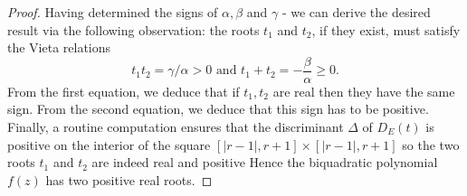 \documentclass{article}
\theoremstyle{definition}
\renewcommand{\|}{|}
\newcommand{\arun}[1]{{\color{cyan} #1}}
\begin{document}
\begin{proof}
Having determined the signs of $\alpha,\beta$ and $\gamma$ - we can derive the desired result via the following observation: the roots $t_1$ and $t_2$, if they exist, must satisfy the Vieta relations $$t_1t_2 = \gamma/\alpha > 0 \text{ and } t_1 + t_2 = -\frac{\beta}{\alpha} \geq 0.$$ From the first equation, we deduce that if $t_1, t_2$ are real then they have the same sign. From the second equation, we deduce that this sign has to be positive. Finally, a routine computation ensures that the discriminant $\Delta$ of $D_E(t)$ is 
positive on the interior of the square $[|r-1|, r+1] \times [|r-1|, r+1]$ so
the two roots $t_1$ and $t_2$ are indeed real and positive Hence the biquadratic polynomial $f(z)$ has two positive real roots.    
   
\end{proof}
\end{document}
